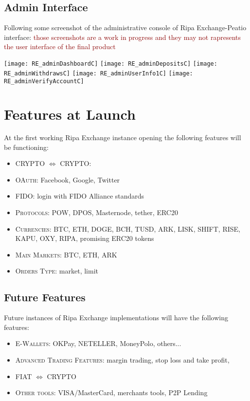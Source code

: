 \documentclass[11pt,fleqn]{book} %
\begin{document}
\subsection{Admin Interface}
Following some screenshot of the administrative console of Ripa Exchange-Peatio interface: 
\textcolor{darkred}{those screenshots are a work in progress and they may not rapresents the user interface of the final product}
\begin{center}
	\texttt{[image: RE\_adminDashboardC]}
	\texttt{[image: RE\_adminDepositsC]}
	\texttt{[image: RE\_adminWithdrawsC]}
	\texttt{[image: RE\_adminUserInfo1C]}
	\texttt{[image: RE\_adminVerifyAccountC]}
\end{center}

\section{Features at Launch}
At the first working Ripa Exchange instance opening the following features will be functioning:
\begin{itemize}
	\item \textsc{CRYPTO $\Leftrightarrow$ CRYPTO}:
	\item \textsc{OAuth}: Facebook, Google, Twitter
	\item \textsc{FIDO}: login with FIDO Alliance standards
	\item \textsc{Protocols}: POW, DPOS, Masternode, tether, ERC20
	\item \textsc{Currencies}: BTC, ETH, DOGE, BCH, TUSD, ARK, LISK, SHIFT, RISE, KAPU, OXY, RIPA, promising ERC20 tokens
	\item \textsc{Main Markets}: BTC, ETH, ARK
	\item \textsc{Orders Type}: market, limit
\end{itemize}

\subsection{Future Features}
Future instances of Ripa Exchange implementations will have the following features:
\begin{itemize}
	\item \textsc{E-Wallets}: OKPay, NETELLER, MoneyPolo, others...
	\item \textsc{Advanced Trading Features}: margin trading, stop loss and take profit, 
	\item \textsc{FIAT $\Leftrightarrow$ CRYPTO}
	\item \textsc{Other tools}: VISA/MasterCard, merchants tools, P2P Lending 
\end{itemize}
\end{document}
